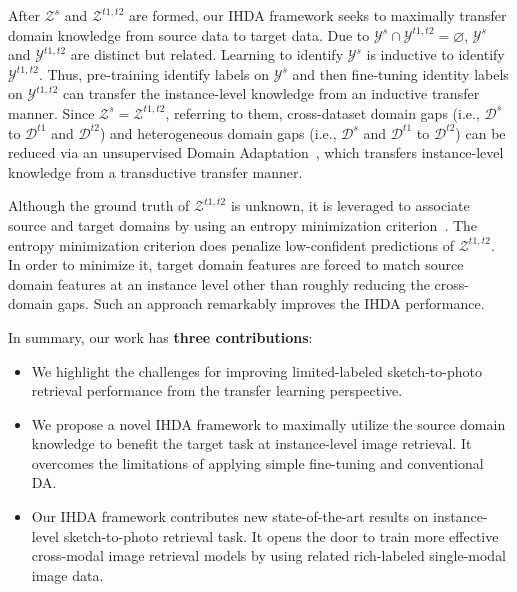 \documentclass[journal]{IEEEtran}
\begin{document}
After $\mathcal{Z}^{s}$ and $\mathcal{Z}^{t1,t2}$ are formed, our IHDA framework seeks to maximally transfer domain knowledge from source data to target data. Due to $\mathcal{Y}^{s} \cap \mathcal{Y}^{t1,t2} = \varnothing$, $\mathcal{Y}^{s}$ and  $\mathcal{Y}^{t1,t2}$ are distinct but related. Learning to identify $\mathcal{Y}^{s}$ is inductive to identify $\mathcal{Y}^{t1,t2}$. Thus, pre-training identify labels on $\mathcal{Y}^{s}$ and then fine-tuning identity labels on $\mathcal{Y}^{t1,t2}$ can transfer the instance-level knowledge from an inductive transfer manner. Since $\mathcal{Z}^{s}=\mathcal{Z}^{t1,t2}$, referring to them, cross-dataset domain gaps (i.e., $\mathcal{D}^{s}$ to $\mathcal{D}^{t1}$ and $\mathcal{D}^{t2}$) and heterogeneous domain gaps (i.e., $\mathcal{D}^{s}$ and $\mathcal{D}^{t1}$ to $\mathcal{D}^{t2}$) can be reduced via an unsupervised Domain Adaptation~\cite{pei2018multi,rozantsev2018beyond,cao2018partial,zou2019consensus}, which transfers instance-level knowledge from a transductive transfer manner.


Although the ground truth of $\mathcal{Z}^{t1,t2}$ is unknown, it is leveraged to associate source and target domains by using an entropy minimization criterion~\cite{luo2017label}. The entropy minimization criterion does penalize low-confident predictions of $\mathcal{Z}^{t1,t2}$. In order to minimize it, target domain features are forced to match source domain features at an instance level other than roughly reducing the cross-domain gaps. Such an approach remarkably improves the IHDA performance. 

In summary, our work has \textbf{three contributions}:

\begin{itemize}
\item We highlight the challenges for improving limited-labeled sketch-to-photo retrieval performance from the transfer learning perspective.
\item We propose a novel IHDA framework to maximally utilize the source domain knowledge to benefit the target task at instance-level image retrieval. It overcomes the limitations of applying simple fine-tuning and conventional DA.
\item Our IHDA framework contributes new state-of-the-art results on instance-level sketch-to-photo retrieval task. It opens the door to train more effective cross-modal image retrieval models by using related rich-labeled single-modal image data. 
\end{itemize} 
\end{document}
